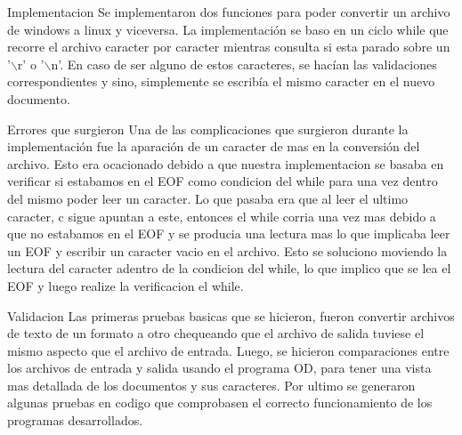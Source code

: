 \documentclass[11pt]{article}
\begin{document}
Implementacion
Se implementaron dos funciones para poder convertir un archivo de windows a linux y viceversa. La implementaci\'on se baso en un ciclo while que recorre el archivo caracter por caracter mientras consulta si esta parado sobre un '$\backslash$r' o '$\backslash$n'. En caso de ser alguno de estos caracteres, se hac\'ian las validaciones correspondientes y sino, simplemente se escribía el mismo caracter en el  nuevo documento.

Errores que surgieron 
Una de las complicaciones que surgieron durante la implementaci\'on fue la aparaci\'on de un caracter de mas en la conversi\'on del archivo. Esto era ocacionado debido a que nuestra implementacion se basaba en verificar si estabamos en el EOF como condicion del while para una vez dentro del mismo poder leer un caracter. Lo que pasaba era que al leer el ultimo caracter, c sigue apuntan a este, entonces el while corria una vez mas debido a que no estabamos en el EOF y se producia una lectura mas lo que implicaba leer un EOF y escribir un caracter vacio en el archivo. Esto se soluciono moviendo la lectura del caracter adentro de la condicion del while, lo que implico que se lea el EOF y luego realize la verificacion el while.


Validacion
Las primeras pruebas basicas que se hicieron, fueron convertir archivos de texto de un formato a otro chequeando que el archivo de salida tuviese el mismo aspecto que el archivo de entrada. Luego, se hicieron comparaciones entre los archivos de entrada y salida usando el programa OD, para tener una vista mas detallada de los documentos y sus caracteres. Por ultimo se generaron algunas pruebas en codigo que comprobasen el correcto funcionamiento de los programas desarrollados.
\end{document}
